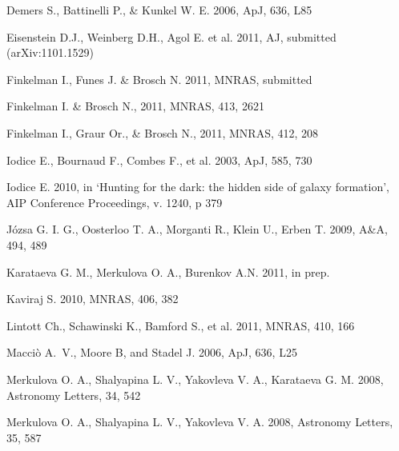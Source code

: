 \documentclass[useAMS,usenatbib]{mn2e}
\begin{document}
\begin{thebibliography}{}
Demers S., Battinelli P.,   \& Kunkel W. E.  2006, ApJ, 636, L85

Eisenstein D.J., Weinberg D.H., Agol E. et al. 2011, AJ, submitted (arXiv:1101.1529)


Finkelman I., Funes J. \& Brosch N. 2011, MNRAS, submitted

Finkelman I. \&  Brosch N., 2011, MNRAS, 413, 2621


Finkelman I.,  Graur Or., \&  Brosch N., 2011, MNRAS, 412, 208


Iodice E.,  Bournaud F.,  Combes F., et al. 2003, ApJ, 585, 730

Iodice E.  2010, in `Hunting  for the dark: the hidden side of galaxy formation',
AIP Conference Proceedings, v. 1240, p 379


J{\'o}zsa  G. I. G., Oosterloo  T. A., Morganti  R., Klein  U., Erben T. 2009, A\&A, 494, 489

Karataeva G. M., Merkulova O. A., Burenkov A.N.  2011, in prep.


Kaviraj S. 2010, MNRAS, 406, 382


Lintott Ch.,   Schawinski K., Bamford S., et al. 2011, MNRAS, 410, 166

Macci{\`o}  A.~V.,  {Moore}  B, and   {Stadel} J. 2006, ApJ, 636, L25

Merkulova O. A., Shalyapina  L. V., Yakovleva V. A., Karataeva G. M. 2008, Astronomy Letters, 34, 542

Merkulova O. A., Shalyapina  L. V., Yakovleva V. A.  2008, Astronomy Letters, 35, 587


\end{thebibliography}
\end{document}
